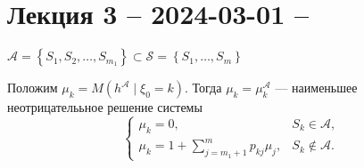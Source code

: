 \section{Лекция 3 -- 2024-03-01 -- }

\begin{theorem}
  $\mathscr{A} = \left\{ S_1, S_2, \dots, S_{m_1} \right\} \subset \mathscr S = \left\{ S_1, \dots, S_m \right\} $
\end{theorem}




\begin{theorem}
  Положим $\mu_k = M(h^{\mathscr A} \mid \xi_0=k)$. Тогда $\mu_k = \mu_k^{\mathscr A}$ --- наименьшее неотрицателььное решение системы
  \[
    \begin{cases}
      \mu_k = 0, & S_k \in \mathscr{A}, \\
      \mu_k = 1 + \!\!\!\!\sum\limits_{j={m_1+1}}^m p_{kj} \mu_j, &S_k \notin
      \mathscr{A}.
    \end{cases}
  \]
\end{theorem}

